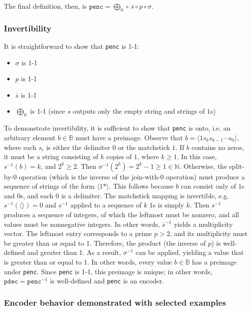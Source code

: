 \documentclass[12pt,reqno]{article}
\begin{document}
The final definition, then, is $\texttt{penc} = \bigoplus_0 \circ \, \overline{s} \circ p \circ \sigma$.

\subsubsection{Invertibility}

It is straightforward to show that \texttt{penc} is 1-1: \begin{itemize}
  \item $\sigma$ is 1-1
  \item $p$ is 1-1
  \item $\overline{s}$ is 1-1
  \item $\bigoplus_0$ is 1-1 (since $s$ outputs only the empty string and strings of $1$s)
\end{itemize}


To demonstrate invertibility, it is sufficient to show that \texttt{penc} is onto, i.e. an arbitrary element $b \in \mathbb{B}$ must have a preimage. Observe that $b = \langle 1 s_{k} s_{k-1} \cdots s_0 \rangle$, where each $s_i$ is either the delimiter $0$ or the matchstick $1$. If $b$ contains no zeros, it must be a string consisting of $k$ copies of $1$, where $k \geq 1$. In this case, $s^{-1}(b) = k$, and $2^k \geq 2$. Then $\sigma^{-1}(2^k) = 2^k - 1 \geq 1\in \mathbb{N}$. Otherwise, the split-by-$0$ operation (which is the inverse of the join-with-$0$ operation) must produce a sequence of strings of the form $\langle 1* \rangle$. This follows because $b$ can consist only of $1$s and $0$s, and each $0$ is a delimiter. The matchstick mapping is invertible, e.g. $s^{-1}(\langle \rangle) = 0$ and $s^{-1}$ applied to a sequence of $k$ $1$s is simply $k$. Then $\overline{s}^{-1}$ produces a sequence of integers, of which the leftmost must be nonzero, and all values must be nonnegative integers. In other words, $\overline{s}^{-1}$ yields a multiplicity vector. The leftmost entry corresponds to a prime $p > 2$, and its multiplicity must be greater than or equal to 1. Therefore, the product (the inverse of $p$) is well-defined and greater than 1. As a result, $\sigma^{-1}$ can be applied, yielding a value that is greater than or equal to 1. In other words, every value $b \in \mathbb{B}$ has a preimage under \texttt{penc}. Since \texttt{penc} is 1-1, this preimage is unique; in other words, $\texttt{pdec} = \texttt{penc}^{-1}$ is well-defined and \texttt{penc} is an encoder.

\subsubsection{Encoder behavior demonstrated with selected examples}
\end{document}
